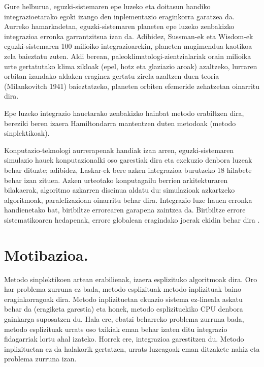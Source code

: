 Gure helburua, eguzki-sistemaren epe luzeko eta doitasun handiko integrazioetarako egoki izango den inplementazio eraginkorra garatzea da. Aurreko hamarkadetan, eguzki-sistemaren planeten epe luzeko zenbakizko integrazioa erronka garrantzitsua izan da. Adibidez, Sussman-ek eta Wisdom-ek  eguzki-sistemaren 100 milioiko integrazioarekin, planeten mugimendua kaotikoa zela baieztatu zuten. Aldi berean, paleoklimatologi-zientzialariak orain milioika urte gertatutako klima zikloak (epel, hotz eta glaziazio aroak) azaltzeko, lurraren orbitan izandako aldaken eraginez gertatu zirela azaltzen duen teoria (Milankovitch 1941) \cite{Berger2012} baieztatzeko, planeten orbiten efemeride zehatzetan oinarritu dira.        

Epe luzeko integrazio hauetarako zenbakizko hainbat metodo erabiltzen dira, bereziki beren izaera Hamiltondarra mantentzen duten metodoak (metodo sinplektikoak).

Konputazio-teknologi aurrerapenak handiak izan arren, eguzki-sistemaren simulazio hauek konputazionalki oso garestiak dira eta exekuzio denbora luzeak behar dituzte; adibidez, Laskar-ek  bere azken integrazioa burutzeko 18 hilabete behar izan zituen.
Azken urteotako konputagailu berrien arkitekturaren bilakaerak, algoritmo azkarren diseinua aldatu du: simulazioak azkartzeko algoritmoak, paralelizazioan oinarritu behar dira. Integrazio luze hauen erronka handienetako bat, biribiltze errorearen garapena zaintzea da. Biribiltze errore sistematikoaren hedapenak, errore globalean eragindako joerak ekidin behar dira \cite{Laskar2015}.
 
\section{Motibazioa.}
\label{intro}


Metodo sinplektikoen artean erabilienak, izaera esplizituko algoritmoak dira. Oro har problema zurruna ez bada, metodo esplizituak  metodo inplizituak baino eraginkorragoak dira. Metodo inplizituetan ekuazio sistema ez-lineala askatu behar da (eragiketa garestia) eta honek, metodo esplizituekiko CPU denbora gainkarga suposatzen du. Hala ere, ebatzi beharreko problema zurruna bada, metodo esplizituak urrats oso txikiak eman behar izaten ditu integrazio fidagarriak lortu ahal izateko. Horrek ere, integrazioa garestitzen du. Metodo inplizituetan ez da halakorik gertatzen, urrats luzeagoak eman ditzakete nahiz eta problema zurruna izan. 


